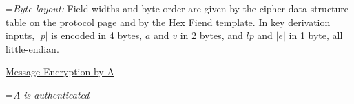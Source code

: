 \documentclass{article}
\newlength{\stanzagap}
\newlength{\notegap}
\newlength{\stanzawidth}
\newlength{\stanzabox}
\newenvironment{stanza}[1][\stanzawidth]
  {\par\addvspace{\stanzagap}%
   \setlength{\stanzabox}{\dimexpr\linewidth-\parindent\relax}%
   \ifdim\stanzabox>#1\setlength{\stanzabox}{#1}\fi
   \noindent\hspace*{\parindent}\begin{minipage}{\stanzabox}}
  {\end{minipage}\par\addvspace{\stanzagap}}
\begin{document}
\begin{stanza}
\vspace{\notegap}

{\leftskip=\parindent\noindent\textit{Byte layout:} Field widths and byte order are given by the cipher data structure table on the \href{https://quickcrypt.org/help/protocol}{protocol page} and by the \href{https://quickcrypt.org/help/faqs/6f6}{Hex Fiend template}. In key derivation inputs, $|p|$ is encoded in 4 bytes, $a$ and $v$ in 2 bytes, and $\mathit{lp}$ and $|e|$ in 1 byte, all little-endian.\par}
\end{stanza}

\begin{stanza}
\underline{Message Encryption by A}\\

{\leftskip=\parindent\noindent\textit{A is authenticated}\par}


\end{stanza}
\end{document}
